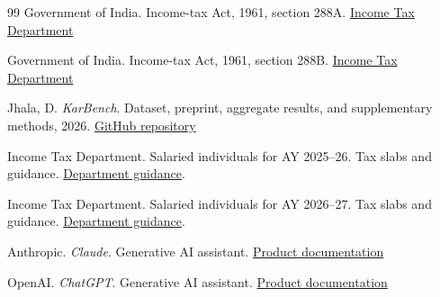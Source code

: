 \documentclass[10pt,letterpaper,twocolumn]{article}
\begin{document}
\begin{thebibliography}{99}
Government of India. Income-tax Act, 1961, section 288A. \href{https://www.incometaxindia.gov.in/w/section-288a-31}{Income Tax Department}

Government of India. Income-tax Act, 1961, section 288B. \href{https://wm.incometaxindia.gov.in/w/section-288b-50}{Income Tax Department}

Jhala, D. \textit{KarBench}. Dataset, preprint, aggregate results, and supplementary methods, 2026. \href{https://github.com/Devrajsinh-Jhala/KarBench}{GitHub repository}

Income Tax Department. Salaried individuals for AY 2025--26. Tax slabs and guidance.
\href{https://www.incometax.gov.in/iec/foportal/help/individual/return-applicable-3}{Department guidance}.

Income Tax Department. Salaried individuals for AY 2026--27. Tax slabs and guidance.
\href{https://www.incometax.gov.in/iec/foportal/help/individual/return-applicable-1}{Department guidance}.

Anthropic. \textit{Claude}. Generative AI assistant. \href{https://www.anthropic.com/claude}{Product documentation}

OpenAI. \textit{ChatGPT}. Generative AI assistant. \href{https://openai.com/chatgpt/overview/}{Product documentation}

\end{thebibliography}
\end{document}

